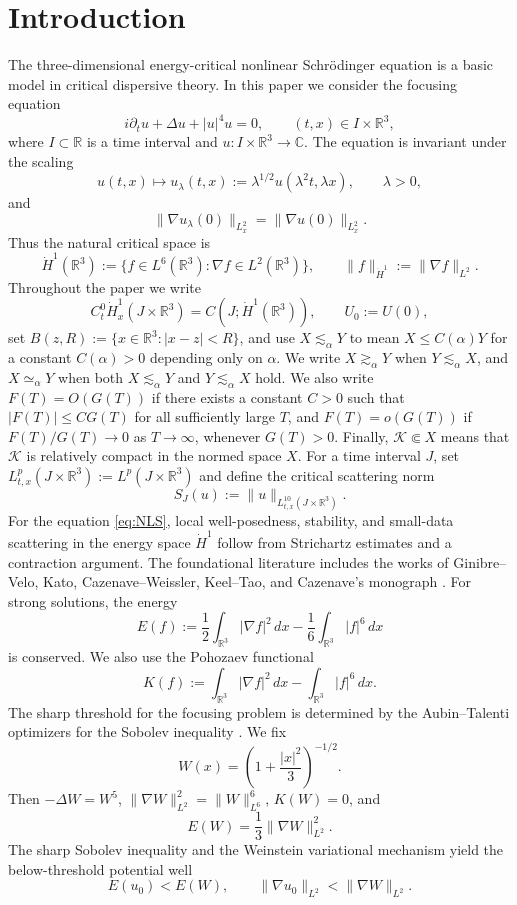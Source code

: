 \documentclass[smallextended,envcountsect,nospthms]{svjour3}
\numberwithin{equation}{section}
\theoremstyle{spbreak}
\theoremstyle{spdefbreak}
\theoremstyle{spdefbreak}
\newcommand{\R}{\mathbb R}
\newcommand{\C}{\mathbb C}
\begin{document}
\section{Introduction}

The three-dimensional energy-critical nonlinear Schr\"odinger equation is a basic model in critical dispersive theory. In this paper we consider the focusing equation
\begin{equation}\label{eq:NLS}
  i\partial_tu+\Delta u+|u|^4u=0,
  \qquad (t,x)\in I\times\R^3,
\end{equation}
where $I\subset\R$ is a time interval and $u:I\times\R^3\to\C$. The equation is invariant under the scaling
\[
  u(t,x)\mapsto u_\lambda(t,x):=\lambda^{1/2}u(\lambda^2t,\lambda x),
  \qquad \lambda>0,
\]
and
\[
  \|\nabla u_\lambda(0)\|_{L_x^2}=\|\nabla u(0)\|_{L_x^2}.
\]
Thus the natural critical space is
\[
  \dot H^1(\R^3):=\{f\in L^6(\R^3):\nabla f\in L^2(\R^3)\},
  \qquad \|f\|_{\dot H^1}:=\|\nabla f\|_{L^2}.
\]
Throughout the paper we write
\[
  C_t^0\dot H_x^1(J\times\R^3)=C(J;\dot H^1(\R^3)),
  \qquad U_0:=U(0),
\]
set $B(z,R):=\{x\in\R^3:|x-z|<R\}$, and use $X\lesssim_\alpha Y$ to mean $X\le C(\alpha)Y$ for a constant $C(\alpha)>0$ depending only on $\alpha$. We write $X\gtrsim_\alpha Y$ when $Y\lesssim_\alpha X$, and $X\simeq_\alpha Y$ when both $X\lesssim_\alpha Y$ and $Y\lesssim_\alpha X$ hold. We also write $F(T)=O(G(T))$ if there exists a constant $C>0$ such that $|F(T)|\le C G(T)$ for all sufficiently large $T$, and $F(T)=o(G(T))$ if $F(T)/G(T)\to0$ as $T\to\infty$, whenever $G(T)>0$. Finally, $\mathcal K\Subset X$ means that $\mathcal K$ is relatively compact in the normed space $X$. For a time interval $J$, set $L_{t,x}^p(J\times\R^3):=L^p(J\times\R^3)$ and define the critical scattering norm
\[
  S_J(u):=\|u\|_{L_{t,x}^{10}(J\times\R^3)}.
\]
For the equation \eqref{eq:NLS}, local well-posedness, stability, and small-data scattering in the energy space $\dot H^1$ follow from Strichartz estimates and a contraction argument. The foundational literature includes the works of Ginibre--Velo, Kato, Cazenave--Weissler, Keel--Tao, and Cazenave's monograph \cite{GinibreVelo1979I,GinibreVelo1979II,GinibreVelo1985,Kato1987,CazenaveWeissler1990,KeelTao1998,Cazenave2003}. For strong solutions, the energy
\[
  E(f):=\frac12\int_{\R^3}|\nabla f|^2\,dx-
       \frac16\int_{\R^3}|f|^6\,dx
\]
is conserved. We also use the Pohozaev functional
\[
  K(f):=\int_{\R^3}|\nabla f|^2\,dx-
       \int_{\R^3}|f|^6\,dx.
\]
The sharp threshold for the focusing problem is determined by the Aubin--Talenti optimizers for the Sobolev inequality \cite{Aubin1976,Talenti1976}. We fix
\[
  W(x)=\left(1+\frac{|x|^2}{3}\right)^{-1/2}.
\]
Then $-\Delta W=W^5$, $\|\nabla W\|_{L^2}^2=\|W\|_{L^6}^6$, $K(W)=0$, and
\[
  E(W)=\frac13\|\nabla W\|_{L^2}^2.
\]
The sharp Sobolev inequality and the Weinstein variational mechanism \cite{Weinstein1983} yield the below-threshold potential well
\[
  E(u_0)<E(W),\qquad \|\nabla u_0\|_{L^2}<\|\nabla W\|_{L^2}.
\]
\end{document}
